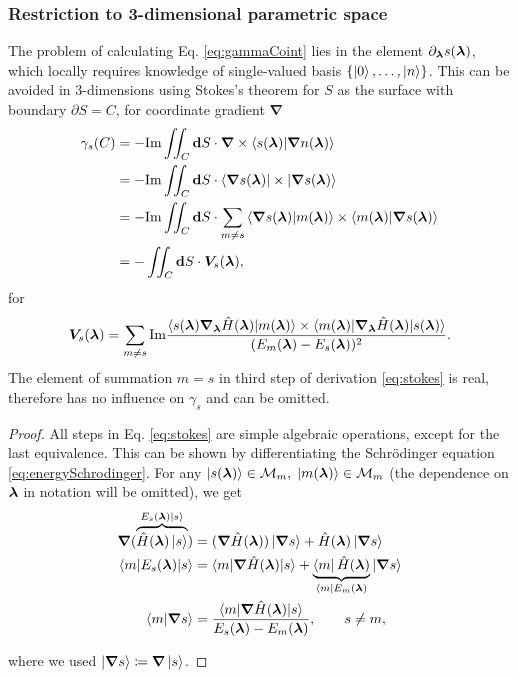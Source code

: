 \subsubsection{Restriction to 3-dimensional parametric space}
The problem of calculating Eq. \ref{eq:gammaCoint} lies in the element $\partial_{\bm\lambda} s({\bm\lambda})$, which locally requires knowledge of single-valued basis $\{\ket{0},\dots, \ket{n}\}$. This can be avoided in 3-dimensions using Stokes's theorem for $S$ as the surface with boundary $\partial S=C$, for coordinate gradient $\bm \nabla$
\begin{equation}
    \begin{split}
        \gamma_s(C) &= -\textrm{Im} \iint_C \bm{\mathrm{d}} S \cdot \bm \nabla \times \braket{s({\bm\lambda})|\bm \nabla n({\bm\lambda})}\\
         &= -\textrm{Im} \iint_C \bm{\mathrm{d}} S \cdot \braket{\bm \nabla s({\bm\lambda})|\times|\bm \nabla s({\bm\lambda})}\\
        &= -\textrm{Im} \iint_C \bm{\mathrm{d}} S \cdot \sum_{m\neq s} \braket{\bm \nabla s({\bm\lambda})|m({\bm\lambda})}\times \braket{m({\bm\lambda})|\bm \nabla s({\bm\lambda})}\\
        &= -\iint_C \bm{\mathrm{d}} S \cdot \bm V_s({\bm\lambda}),
    \end{split}
    \label{eq:stokes}
\end{equation}
for 
\begin{equation}
    \bm V_s({\bm\lambda}) = \sum_{m\neq s} \textrm{Im} \frac{
            \braket{s({\bm\lambda})\bm \nabla_{\bm\lambda} \hat{H}({\bm\lambda}) |m({\bm\lambda})}\times \braket{m({\bm\lambda})|\bm \nabla_{\bm\lambda} \hat{H}({\bm\lambda})|s({\bm\lambda})}    
             }{
(E_m({\bm\lambda})-E_s({\bm\lambda}))^2
             }.
\end{equation}
The element of summation $m=s$ in third step of derivation \ref{eq:stokes} is real, therefore has no influence on $\gamma_s$ and can be omitted. 

\begin{proof}
 All steps in Eq. \ref{eq:stokes} are simple algebraic operations, except for the last equivalence. This can be shown by differentiating the Schr\"odinger equation \ref{eq:energySchrodinger}. For any $\ket{s({\bm\lambda})}\in \mathcal{M}_m,\;\ket{m({\bm\lambda})}\in \mathcal{M}_m$ (the dependence on ${\bm\lambda}$ in notation will be omitted), we get
\begin{equation}
    \begin{split}
        \bm \nabla (\overbrace{\hat{H}({\bm\lambda})\ket{s}}^{E_s({\bm\lambda})\ket{s}})&= (\bm\nabla \hat{H}({\bm\lambda}))\ket{\bm \nabla s} +\hat{H}({\bm\lambda}) \ket{\bm \nabla s}\\
        \braket{m|E_s({\bm\lambda})|s}&= \braket{m|\bm \nabla \hat{H}({\bm\lambda})| s}+ \underbrace{\bra{m} \hat{H}({\bm\lambda})}_{\bra{m} E_m({\bm\lambda})} |\bm\nabla s\rangle \\
        \braket{m|\bm \nabla s}&=
        \frac{\braket{m|\bm \nabla \hat{H}({\bm\lambda}) |s}}
        { E_s({\bm\lambda})-E_m({\bm\lambda})}, \qquad s\neq m,
    \end{split}
\end{equation}

where we used $\ket{\bm \nabla s}\coloneqq\bm \nabla \ket{ s}$.    
\end{proof} 

